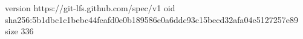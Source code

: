 version https://git-lfs.github.com/spec/v1
oid sha256:5b1dbc1c1bebc44feafd0e0b189586e0a6ddc93c15becd32afa04e5127257e89
size 336

